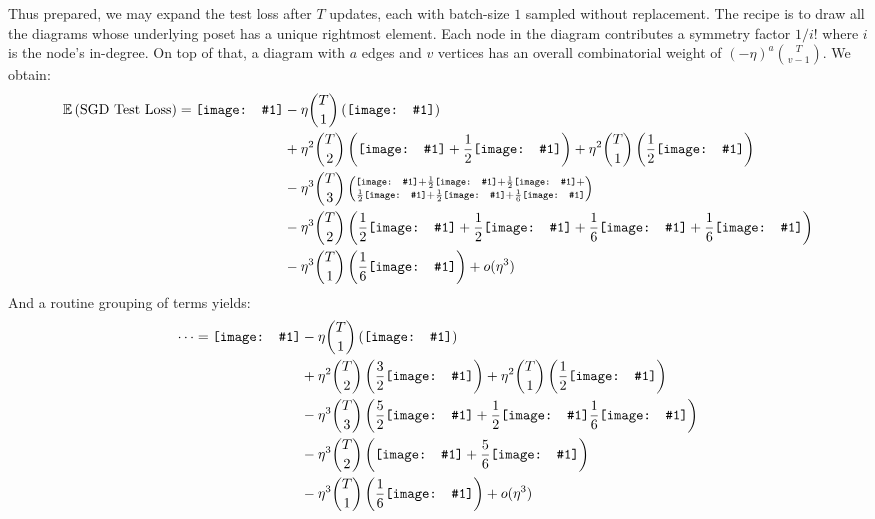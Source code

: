 \documentclass[12pt]{article}
\newcommand{\half}{\frac{1}{2}}
\newcommand{\sixth}{\frac{1}{6}}
\newcommand{\dia}[1]{\texttt{[image: \#1]}}
\begin{document}
        Thus prepared, we may expand the test loss after $T$ updates, each with batch-size $1$ sampled without
        replacement.  The recipe is to draw all the diagrams whose underlying poset has a unique rightmost element.
        Each node in the diagram contributes a symmetry factor $1/i!$ where $i$ is the node's in-degree.  On top of
        that, a diagram with $a$ edges and $v$ vertices has an overall combinatorial weight of
        $(-\eta)^a {T \choose v-1}$.  We obtain:
        \begin{align*}
            \expec \wrap{\text{SGD Test Loss}} = \dia{sgd-0}
            &- \eta   {T \choose 1} \wrap{\dia{sgd-1}} \\
            &+ \eta^2 {T \choose 2} \wrap{\dia{sgd-2a} + \half \dia{sgd-2b}}
             + \eta^2 {T \choose 1} \wrap{\half \dia{sgd-2c}} \\
            &- \eta^3 {T \choose 3} \wrap{\substack{
                \dia{sgd-3a} + \half \dia{sgd-3b} + \half \dia{sgd-3c} + \\
                 \half \dia{sgd-3d} + \half \dia{sgd-3e} + \sixth \dia{sgd-3f}}} \\
            &- \eta^3 {T \choose 2} \wrap{\half \dia{sgd-3g} + \half \dia{sgd-3h} + \sixth \dia{sgd-3i} + \sixth \dia{sgd-3j}} \\
            &- \eta^3 {T \choose 1} \wrap{\sixth \dia{sgd-3k}} 
             + o(\eta^3)
        \end{align*}
        And a routine grouping of terms yields:
        \begin{align*}
            \cdots = \dia{sgd-0}
            &- \eta   {T \choose 1} \wrap{\dia{sgd-1}} \\
            &+ \eta^2 {T \choose 2} \wrap{\frac{3}{2}\dia{sgd-2a}}
             + \eta^2 {T \choose 1} \wrap{\half \dia{sgd-2c}} \\
            &- \eta^3 {T \choose 3} \wrap{\frac{5}{2} \dia{sgd-3a} + \half \dia{sgd-3b} \sixth \dia{sgd-3f}} \\
            &- \eta^3 {T \choose 2} \wrap{\dia{sgd-3g} + \frac{5}{6} \dia{sgd-3h}} \\
            &- \eta^3 {T \choose 1} \wrap{\sixth \dia{sgd-3k}} 
             + o(\eta^3)
        \end{align*}
\end{document}
